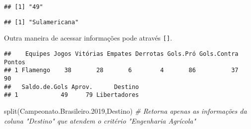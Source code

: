 \documentclass[
]{book}
\newenvironment{Shaded}{\begin{snugshade}}{\end{snugshade}}
\newcommand{\CommentTok}[1]{\textcolor[rgb]{0.56,0.35,0.01}{\textit{#1}}}
\newcommand{\DecValTok}[1]{\textcolor[rgb]{0.00,0.00,0.81}{#1}}
\newcommand{\FloatTok}[1]{\textcolor[rgb]{0.00,0.00,0.81}{#1}}
\newcommand{\FunctionTok}[1]{\textcolor[rgb]{0.00,0.00,0.00}{#1}}
\newcommand{\NormalTok}[1]{#1}
\newcommand{\SpecialCharTok}[1]{\textcolor[rgb]{0.00,0.00,0.00}{#1}}
\newcommand{\StringTok}[1]{\textcolor[rgb]{0.31,0.60,0.02}{#1}}
\begin{document}
\begin{Shaded}
\end{Shaded}

\begin{verbatim}
## [1] "49"
\end{verbatim}

\begin{Shaded}
\end{Shaded}

\begin{verbatim}
## [1] "Sulamericana"
\end{verbatim}

Outra maneira de acessar informações pode através \texttt{{[}{]}}.

\begin{Shaded}
\end{Shaded}

\begin{verbatim}
##    Equipes Jogos Vitórias Empates Derrotas Gols.Pró Gols.Contra Pontos
## 1 Flamengo    38       28       6        4       86          37     90
##   Saldo.de.Gols Aprov.      Destino
## 1            49     79 Libertadores
\end{verbatim}

\begin{Shaded}
\begin{Highlighting}[]
\FunctionTok{split}\NormalTok{(Campeonato.Brasileiro}\FloatTok{.2019}\NormalTok{,Destino) }\CommentTok{\# Retorna apenas as informações da coluna "Destino" que atendem o critério "Engenharia Agrícola"}
\end{Highlighting}
\end{Shaded}
\end{document}
